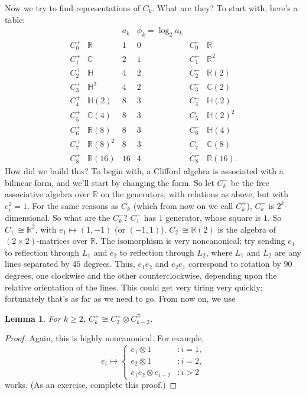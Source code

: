 \documentclass{article}
\newcommand{\C}{\mathbb{C}}
\newcommand{\R}{\mathbb{R}}
\newtheorem{lem}[thm]{Lemma}
\begin{document}
Now we try to find representations of $C_k$.  What are they?  To start with, here's a table:
\[\begin{array}{cccc|cc} %
& & a_k & \phi_k = \log_2 a_k \\
C_0^+ & \R & 1 & 0 & C_0^- & \R \\
C_1^+ & \C & 2 & 1 & C_1^- & \R^2 \\
C_2^+ & \mathbb{H} & 4 & 2 & C_2^- & \R(2) \\
C_3^+ & \mathbb{H}^2 & 4 & 2 & C_3^- & \C(2) \\
C_4^+ & \mathbb{H}(2) & 8 & 3 & C_4^- & \mathbb{H}(2) \\
C_5^+ & \C(4) & 8 & 3 & C_5^- & \mathbb{H}(2)^2 \\
C_6^+ & \R(8) & 8 & 3 & C_6^- & \mathbb{H}(4) \\
C_7^+ & \R(8)^2 & 8 & 3 & C_7^- & \C(8) \\
C_8^+ & \R(16) & 16 & 4 & C_8^- & \R(16).
\end{array}\] %
How did we build this?  To begin with, a Clifford algebra is associated with a bilinear form, and we'll start by changing the form.  So let $C_k^-$ be the free associative algebra over $\R$ on the generators, with relations as above, %
but with $e_i^2 = 1$.  For the same reasons as $C_k$ (which from now on we call $C_k^+$), $C_k^-$ is $2^k$-dimensional.  So what are the $C_k^-$?  $C_1^-$ has $1$ generator, whose square is $1$.  So $C_1^- \cong \R^2$, with $e_1 \mapsto (1, -1)$ (or $(-1, 1)$).  $C_2^- \cong \R(2)$ is the algebra of $(2 \times 2)$-matrices over $\R$.  The isomorphism is very noncanonical; try sending %
$e_1$ to reflection through $L_1$ and $e_2$ to reflection through $L_2$, where $L_1$ and $L_2$ are any lines separated by $45$ degrees.  Thus, $e_1e_2$ and $e_2e_1$ correspond to rotation by $90$ degrees, one clockwise and the other counterclockwise, depending upon the relative orientation of the lines.  This could get very tiring very quickly; fortunately that's as far as we need to go.  From now on, we use
\begin{lem}
For $k \ge 2$, $C_k^\pm \cong C_2^\pm \otimes C_{k-2}^\mp$.
\end{lem}
\begin{proof}
Again, this is highly noncanonical.  For example,
\[
e_i \mapsto
\begin{cases}
e_1 \otimes 1 & : i = 1, \\
e_2 \otimes 1 & : i = 2, \\
e_1e_2 \otimes e_{i-2} &: i > 2
\end{cases}
\]
works.  (As an exercise, complete this proof.)
\end{proof}
\end{document}
